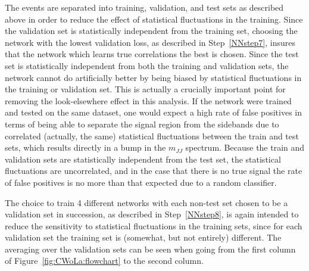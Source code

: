The events are separated into training, validation, and test sets as described above in order to reduce the effect of statistical fluctuations in the training.
Since the validation set is statistically independent from the training set, choosing the network with the lowest validation loss, as described in Step~\ref{NNstep7}, insures that the network which learns true correlations the best is chosen.
Since the test set is statistically independent from both the training and validation sets, the network cannot do artificially better by being biased by statistical fluctuations in the training or validation set.
This is actually a crucially important point for removing the look-elsewhere effect in this analysis.
If the network were trained and tested on the same dataset, one would expect a high rate of false positives in terms of being able to separate the signal region from the sidebands due to correlated (actually, the same) statistical fluctuations between the train and test sets, which results directly in a bump in the $m_{JJ}$ spectrum.
Because the train and validation sets are statistically independent from the test set, the statistical fluctuations are uncorrelated, and in the case that there is no true signal the rate of false positives is no more than that expected due to a random classifier. 

The choice to train 4 different networks with each non-test set chosen to be a validation set in succession, as described in Step~\ref{NNstep8}, is again intended to reduce the sensitivity to statistical fluctuations in the training sets, since for each validation set the training set is (somewhat, but not entirely) different.
The averaging over the validation sets can be seen when going from the first column of Figure~\ref{fig:CWoLa:flowchart} to the second column.

